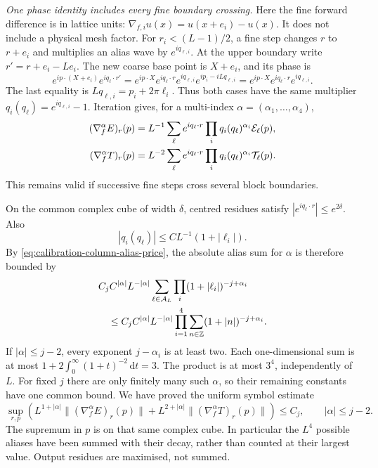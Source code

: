 \documentclass[11pt,reqno]{amsart}
\numberwithin{equation}{section}
\theoremstyle{definition}
\theoremstyle{remark}
\newcommand{\Z}{\mathbb Z}
\newcommand{\dd}{\mathrm d}
\begin{document}
\smallskip\noindent
\emph{One phase identity includes every fine boundary crossing.}
Here the fine forward difference is in lattice units:
\(\nabla_{f,i}u(x)=u(x+e_i)-u(x)\). It does not include
a physical mesh factor. For \(r_i<(L-1)/2\), a fine step
changes \(r\) to \(r+e_i\) and multiplies an alias wave
by \(e^{iq_{\ell,i}}\). At the upper boundary write
\(r'=r+e_i-Le_i\). The new coarse base point is \(X+e_i\),
and its phase is
\begin{equation}
 e^{ip\cdot(X+e_i)}e^{iq_\ell\cdot r'}
  =e^{ip\cdot X}e^{iq_\ell\cdot r}
        e^{iq_{\ell,i}}e^{ip_i-iLq_{\ell,i}}
  =e^{ip\cdot X}e^{iq_\ell\cdot r}e^{iq_{\ell,i}}.
 \label{eq:calibration-residue-boundary-phase}
\end{equation}
The last equality is \(Lq_{\ell,i}=p_i+2\pi\ell_i\).
Thus both cases have the same multiplier
\(q_i(q_\ell)=e^{iq_{\ell,i}}-1\). Iteration gives, for
a multi-index \(\alpha=(\alpha_1,\ldots,\alpha_4)\),
\begin{align}
 (\nabla_f^\alpha E)_r(p)
   &=L^{-1}\sum_\ell e^{iq_\ell\cdot r}
                   \prod_iq_i(q_\ell)^{\alpha_i}\mathcal E_\ell(p),
                                                        \notag\\
 (\nabla_f^\alpha T)_r(p)
   &=L^{-2}\sum_\ell e^{iq_\ell\cdot r}
                   \prod_iq_i(q_\ell)^{\alpha_i}\mathcal T_\ell(p).
 \label{eq:calibration-exact-fine-differences}
\end{align}
This remains valid if successive fine steps cross several
block boundaries.

On the common complex cube of width \(\delta\), centred
residues satisfy \(|e^{iq_\ell\cdot r}|\le e^{2\delta}\).
Also
\[
 |q_i(q_\ell)|\le C L^{-1}(1+|\ell_i|).
\]
By \eqref{eq:calibration-column-alias-price}, the absolute
alias sum for \(\alpha\) is therefore bounded by
\begin{align}
 &C_jC^{|\alpha|}L^{-|\alpha|}
       \sum_{\ell\in\mathcal A_L}
                    \prod_i(1+|\ell_i|)^{-j+\alpha_i}\notag\\
 &\quad\le C_jC^{|\alpha|}L^{-|\alpha|}
                    \prod_{i=1}^4\sum_{n\in\Z}(1+|n|)^{-j+\alpha_i}.
 \label{eq:calibration-factorised-alias-sum}
\end{align}
If \(|\alpha|\le j-2\), every exponent \(j-\alpha_i\)
is at least two. Each one-dimensional sum is at most
\(1+2\int_0^\infty(1+t)^{-2}\,\dd t=3\).
The product is at most \(3^4\), independently of \(L\).
For fixed \(j\) there are only finitely many such
\(\alpha\), so their remaining constants have one common
bound. We have proved the uniform symbol estimate
\begin{equation}
 \sup_{r,p}\left(
 L^{1+|\alpha|}\|(\nabla_f^\alpha E)_r(p)\|
 +L^{2+|\alpha|}\|(\nabla_f^\alpha T)_r(p)\|\right)
                                                    \le C_j,
                      \qquad |\alpha|\le j-2.
 \label{eq:calibration-difference-symbol-bound}
\end{equation}
The supremum in \(p\) is on that same complex cube.
In particular the \(L^4\) possible aliases have been
summed with their decay, rather than counted at their
largest value. Output residues are maximised, not summed.
\end{document}

